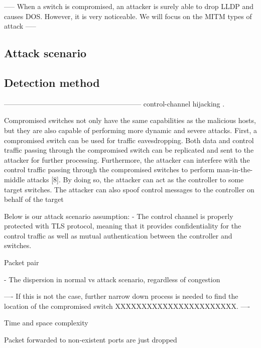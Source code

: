 -----
When a switch is compromised, an attacker is surely able to drop LLDP and causes DOS. However, it is very noticeable. We will focus on the MITM types of attack
-----
\subsection{Attack scenario}
\subsection{Detection method}


-----------------------------------------------------------
control-channel hijacking \cite{AAS14}. 

Compromised switches not only have the same capabilities as the malicious hosts, but they are also capable of performing more dynamic and severe attacks.
First, a compromised switch can be used for traffic eavesdropping. Both data and control traffic passing through the compromised switch can be replicated and sent to the attacker for further processing. Furthermore, the attacker can interfere with the control traffic passing through the compromised
switches to perform man-in-the-middle attacks [8]. By doing so, the
attacker can act as the controller to some target switches. The attacker can
also spoof control messages to the controller on behalf of the target

Below is our attack scenario assumption: 
- The control channel is properly protected with TLS protocol, meaning
that it provides confidentiality for the control traffic as well as mutual
authentication between the controller and switches.

Packet pair

- The dispersion in normal vs attack scenario, regardless of congestion

----
If this is not the case, further narrow down process is needed to find the location of the compromised switch XXXXXXXXXXXXXXXXXXXXXXX.
----

Time and space complexity


Packet forwarded to non-existent ports are just dropped
